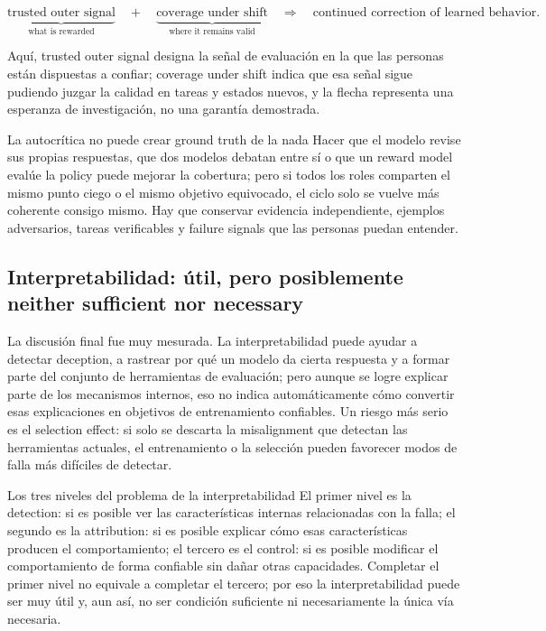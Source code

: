 \documentclass[a4paper]{article}
\begin{document}
\[
\underbrace{\text{trusted outer signal}}_{\text{what is rewarded}}
\quad+\quad
\underbrace{\text{coverage under shift}}_{\text{where it remains valid}}
\quad\Longrightarrow\quad
\text{continued correction of learned behavior}.
\]

Aquí, trusted outer signal designa la señal de evaluación en la que las personas están dispuestas a confiar; coverage under shift indica que esa señal sigue pudiendo juzgar la calidad en tareas y estados nuevos, y la flecha representa una esperanza de investigación, no una garantía demostrada.


\begin{warningbox}{La autocrítica no puede crear ground truth de la nada}
Hacer que el modelo revise sus propias respuestas, que dos modelos debatan entre sí o que un reward model evalúe la policy puede mejorar la cobertura; pero si todos los roles comparten el mismo punto ciego o el mismo objetivo equivocado, el ciclo solo se vuelve más coherente consigo mismo. Hay que conservar evidencia independiente, ejemplos adversarios, tareas verificables y failure signals que las personas puedan entender.
\end{warningbox}

\subsection{Interpretabilidad: útil, pero posiblemente neither sufficient nor necessary}

La discusión final fue muy mesurada. La interpretabilidad puede ayudar a detectar deception, a rastrear por qué un modelo da cierta respuesta y a formar parte del conjunto de herramientas de evaluación; pero aunque se logre explicar parte de los mecanismos internos, eso no indica automáticamente cómo convertir esas explicaciones en objetivos de entrenamiento confiables. Un riesgo más serio es el selection effect: si solo se descarta la misalignment que detectan las herramientas actuales, el entrenamiento o la selección pueden favorecer modos de falla más difíciles de detectar.

\begin{importantbox}{Los tres niveles del problema de la interpretabilidad}
El primer nivel es la detection: si es posible ver las características internas relacionadas con la falla; el segundo es la attribution: si es posible explicar cómo esas características producen el comportamiento; el tercero es el control: si es posible modificar el comportamiento de forma confiable sin dañar otras capacidades. Completar el primer nivel no equivale a completar el tercero; por eso la interpretabilidad puede ser muy útil y, aun así, no ser condición suficiente ni necesariamente la única vía necesaria.
\end{importantbox}
\end{document}
